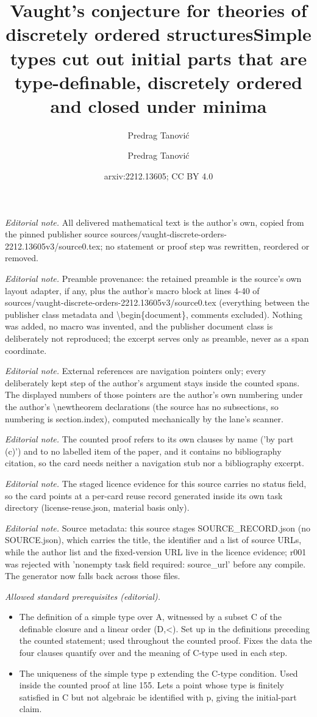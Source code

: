 \documentclass[10pt,a4paper]{amsart}
\title{Vaught's conjecture for theories of discretely ordered structures}
\author{Predrag Tanovi\'c}
\title{Simple types cut out initial parts that are type-definable, discretely ordered and closed under minima}
\author{Predrag Tanović}
\date{arxiv:2212.13605; CC BY 4.0}
\theoremstyle{definition}
\begin{document}
\maketitle
\noindent\textit{Editorial note.} All delivered mathematical text is the author's own, copied from the pinned publisher source sources/vaught-discrete-orders-2212.13605v3/source0.tex; no statement or proof step was rewritten, reordered or removed.\par\medskip
\noindent\textit{Editorial note.} Preamble provenance: the retained preamble is the source's own layout adapter, if any, plus the author's macro block at lines 4-40 of sources/vaught-discrete-orders-2212.13605v3/source0.tex (everything between the publisher class metadata and \textbackslash{}begin\{document\}, comments excluded). Nothing was added, no macro was invented, and the publisher document class is deliberately not reproduced; the excerpt serves only as preamble, never as a span coordinate.\par\medskip
\noindent\textit{Editorial note.} External references are navigation pointers only; every deliberately kept step of the author's argument stays inside the counted spans. The displayed numbers of those pointers are the author's own numbering under the author's \textbackslash{}newtheorem declarations (the source has no subsections, so numbering is section.index), computed mechanically by the lane's scanner.\par\medskip
\noindent\textit{Editorial note.} The counted proof refers to its own clauses by name ('by part (c)') and to no labelled item of the paper, and it contains no bibliography citation, so the card needs neither a navigation stub nor a bibliography excerpt.\par\medskip
\noindent\textit{Editorial note.} The staged licence evidence for this source carries no status field, so the card points at a per-card reuse record generated inside its own task directory (license-reuse.json, material basis only).\par\medskip
\noindent\textit{Editorial note.} Source metadata: this source stages SOURCE\_RECORD.json (no SOURCE.json), which carries the title, the identifier and a list of source URLs, while the author list and the fixed-version URL live in the licence evidence; r001 was rejected with 'nonempty task field required: source\_url' before any compile. The generator now falls back across those files.\par\medskip
\noindent\textit{Allowed standard prerequisites (editorial).}\begin{itemize}
\item The definition of a simple type over A, witnessed by a subset C of the definable closure and a linear order (D,<). Set up in the definitions preceding the counted statement; used throughout the counted proof. Fixes the data the four clauses quantify over and the meaning of C-type used in each step.
\item The uniqueness of the simple type p extending the C-type condition. Used inside the counted proof at line 155. Lets a point whose type is finitely satisfied in C but not algebraic be identified with p, giving the initial-part claim.
\end{itemize}\medskip
\end{document}
